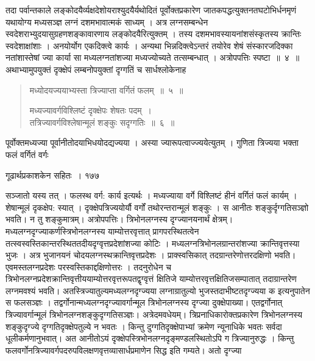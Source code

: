 \documentclass[11pt, openany]{book}
\begin{document}
\begin{sloppypar}
 तदा पर्वान्तकाले लङ्कोदयैर्व्यक्षदेशोयराश्युदयैर्यथोदितं पूर्वोक्तप्रकारेण जातकपद्धत्युक्तनतघटोभिर्धनमृणं यथायोग्य मध्यसञ्ज्ञ लग्नं दशमभावात्मकं साध्यम् । अत्र लग्नसम्बन्धेन स्वदेशराभ्युदयासुग्रहणशङ्कावारणाय लङ्कोदयैरित्युक्तम् । तस्य दशमभावस्यायनांशसंस्कृतस्य क्रान्तिः स्वदेशाक्षांशाः । अनयोर्योग एकदिक्त्वे कार्यः । अन्यथा भिन्नदिक्त्वेऽन्तरं तयोरेव शेषं संस्कारजदिक्का नतांशास्तेषां ज्या कार्या सा मध्यलग्नतांशज्या मध्यज्योच्यते तत्सम्बन्धात् । अत्रोपपत्तिः स्पष्टा~॥~४~॥\\
 \noindent अथाभ्यामुपयुक्तं दृक्क्षेपं लम्बनोपयुक्तां दृग्गतिं च सार्धश्लोकेनाह\textendash
\end{sloppypar}


\begin{quote}
 {\ssi मध्योदयज्ययाभ्यस्ता त्रिज्याप्ता वर्गितं फलम्~॥~५~॥
 
मध्यज्यावर्गविश्लिष्टं दृक्क्षेपः शेषतः पदम्~।\\
तत्रिज्यावर्गविश्लेषान्मूलं शङ्कुः सदृग्गतिः~॥~६~॥}
\end{quote}

\begin{sloppypar}
 पूर्वोक्तमध्यज्या पूर्वानीतोदयाभिधयोदद्यज्यया । अस्या ज्यारूपत्वाज्ज्ययेत्युतम् । गुणिता त्रिज्यया भक्ता फलं वर्गितं वर्गः
\end{sloppypar}
\newpage

\hspace{3cm} गूढार्थप्रकाशकेन सहितः~। \hfill १७७
\vspace{1cm}

\begin{sloppypar}
\noindent सञ्जातो यस्य तत् । फलस्थ वर्ग: कार्य इत्यर्थः । मध्यज्याया वर्गे विश्लिष्टं हीनं वर्गितं फलं कार्यम् । शेषान्मूलं दृकक्षेप: स्यात् । दृक्क्षेपत्रिज्ययोर्यौ वर्गों तथोरन्तरान्मूलं शङ्कुः । स आनीतः शङ्कुर्दृग्गतिसञ्ज्ञो भवति। न तु शङ्कुमात्रम्। अत्रोपपत्तिः। त्रिभोनलग्नस्य दृग्ज्यानयनार्थं क्षेत्रम्। मध्यलग्नदृग्ज्याकर्णस्त्रिभोनलग्नस्य याम्योत्तरवृत्तात् प्रागपरस्थितत्वेन तत्स्वस्वस्तिकान्तरस्थिततदीयदृग्वृत्तप्रदेशांशज्या कोटिः । मध्यलग्नत्रिभोनलग्रान्तरांशज्या क्रान्तिवृत्तस्या भुजः । अत्र भुजानयनं चोदयलग्नस्थक्रान्तिवृत्तप्रदेशः । प्राक्स्वसिकात् तदग्रान्तरेणोत्तरदक्षिणो भवति। एवमस्तलग्नप्रदेशः परस्वस्तिकाद्दक्षिणोत्तरः । तदनुरोधेन च त्रिभोनलग्नप्रदेशक्रान्तिवृत्तीययाम्योत्तरवृत्तरूपतद्वृग्वृत्तं क्षितिजे याम्योत्तरवृत्तक्षितिजसम्पातात् तदाग्रान्तरेण लग्नमवश्यं भवति। अतस्त्रिज्यातुल्यमध्यलग्नदृग्ज्यया लग्नाग्रातुल्यो भुजस्तदाभीष्टतदृग्ज्यया क इत्यनुपातेन स फलसञ्ज्ञः । तद्वर्गोनान्मध्यलग्नदृग्ज्यावर्गान्मूल त्रिभोनलग्नस्य दृग्ज्या दुक्क्षेपाख्या। एतद्वर्गोनात् त्रिज्यावर्गान्मूलं त्रिभोनलग्नशङ्कुदृग्गतिसञ्ज्ञः। अत्रेदमवधेयम्। त्रिप्रनाधिकारोक्तप्रकारेण त्रिभोनलग्नस्य शङ्कुदृग्ज्ये दृग्गतिदृक्क्षेपतुल्ये न भवतः । किन्तु दुग्गतिदृक्क्षेपाभ्यां क्रमेण न्यूनाधिके भवतः सर्वदा धूलीकर्मणानुभवात्। अत आनीतोऽयं दृक्क्षेपस्त्रिभोनलग्नदृङ्मण्डलस्थितोऽपि ग त्रिज्यानुरुद्धः । किन्तु फलवर्गोनत्रिज्यावर्गपदरुपविलक्षणवृत्तव्यासार्धप्रमाणेन सिद्ध इति गम्यते। अतो दृग्ज्या\textendash
\end{sloppypar}
\end{document}
